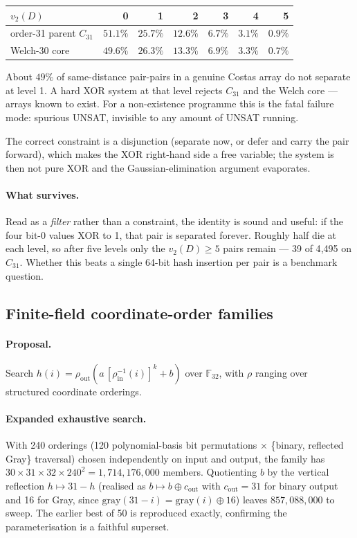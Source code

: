 \documentclass[11pt,a4paper]{article}
\theoremstyle{definition}
\newcommand{\F}{\mathbb{F}}
\newcommand{\vtwo}{v_2}
\begin{document}
\begin{center}
\begin{tabular}{@{}lrrrrrr@{}}
\toprule
$\vtwo(D)$ & 0 & 1 & 2 & 3 & 4 & 5 \\
\midrule
order-31 parent $C_{31}$ & $51.1\%$ & $25.7\%$ & $12.6\%$ & $6.7\%$ & $3.1\%$ & $0.9\%$ \\
Welch-30 core & $49.6\%$ & $26.3\%$ & $13.3\%$ & $6.9\%$ & $3.3\%$ & $0.7\%$ \\
\bottomrule
\end{tabular}
\end{center}

About $49\%$ of same-distance pair-pairs in a genuine Costas array do not
separate at level 1. A hard XOR system at that level rejects $C_{31}$ and the
Welch core --- arrays known to exist. For a non-existence programme this is the
fatal failure mode: spurious UNSAT, invisible to any amount of UNSAT running.

The correct constraint is a disjunction (separate now, or defer and carry the
pair forward), which makes the XOR right-hand side a free variable; the system is
then not pure XOR and the Gaussian-elimination argument evaporates.

\paragraph{What survives.} Read as a \emph{filter} rather than a constraint, the
identity is sound and useful: if the four bit-0 values XOR to 1, that pair is
separated forever. Roughly half die at each level, so after five levels only the
$\vtwo(D)\ge5$ pairs remain --- 39 of 4{,}495 on $C_{31}$. Whether this beats a
single 64-bit hash insertion per pair is a benchmark question.

\subsection{Finite-field coordinate-order families}
\label{sec:gf32}

\paragraph{Proposal.} Search $h(i)=\rho_{\mathrm{out}}\!\left(a\,
[\rho_{\mathrm{in}}^{-1}(i)]^k+b\right)$ over $\F_{32}$, with $\rho$ ranging over
structured coordinate orderings.

\paragraph{Expanded exhaustive search.} With 240 orderings (120 polynomial-basis
bit permutations $\times$ \{binary, reflected Gray\} traversal) chosen
independently on input and output, the family has
$30\times31\times32\times240^2 = 1{,}714{,}176{,}000$ members. Quotienting $b$ by
the vertical reflection $h\mapsto 31-h$ (realised as $b\mapsto b\oplus
c_{\mathrm{out}}$ with $c_{\mathrm{out}}=31$ for binary output and 16 for Gray,
since $\mathrm{gray}(31-i)=\mathrm{gray}(i)\oplus16$) leaves $857{,}088{,}000$ to
sweep. The earlier best of 50 is reproduced exactly, confirming the
parameterisation is a faithful superset.
\end{document}
